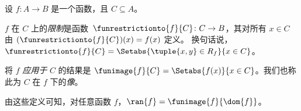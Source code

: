 \documentclass[../../../include/open-logic-section]{subfiles}
\begin{document}
\begin{defn}
设 $f \colon A \to B$ 是一个函数，且 $C\subseteq A$。

$f$ 在 $C$ 上的\emph{限制}是函数~$\funrestrictionto{f}{C}\colon C \to B$，其对所有 $x \in C$ 由 $(\funrestrictionto{f}{C})(x) = f(x)$ 定义。
换句话说，$\funrestrictionto{f}{C} = \Setabs{\tuple{x, y} \in R_f}{x \in
C}$。

将 $f$ \emph{应用于} $C$ 的结果是 $\funimage{f}{C} =
\Setabs{f(x)}{x \in C}$。我们也称此为 $C$ 在 $f$ 下的\emph{像}。
\end{defn}

\begin{explain}
由这些定义可知，对任意函数 $f$，$\ran{f} =
\funimage{f}{\dom{f}}$。
\end{explain}
\end{document}
